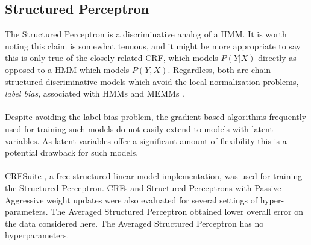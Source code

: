 \documentclass[12pt]{report}
\newcommand{\1}[0]{\mathbbm{1}}
\begin{document}
\subsection{Structured Perceptron}
The Structured Perceptron is a discriminative analog of a \ac{HMM}.
It is worth noting this claim is somewhat tenuous, and it might
be more appropriate to say this is only true of the closely
related \ac{CRF}, which models $P(Y|X)$ directly as opposed to a \ac{HMM}
which models $P(Y,X)$. Regardless, both are chain structured discriminative
models which avoid the local normalization problems, \emph{label bias}, associated
with \acp{HMM} and \acp{MEMM} \cite{lafferty-crf}.
\\\\
Despite avoiding the label bias problem, the gradient based algorithms frequently
used for training such models do not easily extend to models with latent variables.
As latent variables offer a significant amount of flexibility this is a potential
drawback for such models.
\\\\
CRFSuite \cite{CRFsuite}, a free structured linear model implementation, was used
for training the Structured Perceptron. \acp{CRF} and Structured Perceptrons
with Passive Aggressive weight updates were also evaluated for several settings of
hyper-parameters. The Averaged Structured Perceptron obtained lower overall
error on the data considered here. The Averaged Structured Perceptron has no hyperparameters.
\end{document}
